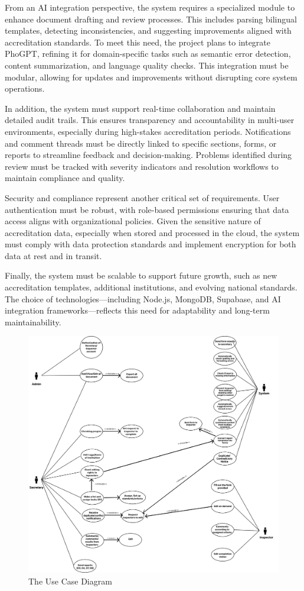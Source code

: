 From an AI integration perspective, the system requires a specialized module to enhance document drafting and review processes. This includes parsing bilingual templates, detecting inconsistencies, and suggesting improvements aligned with accreditation standards. To meet this need, the project plans to integrate PhoGPT, refining it for domain-specific tasks such as semantic error detection, content summarization, and language quality checks. This integration must be modular, allowing for updates and improvements without disrupting core system operations.

In addition, the system must support real-time collaboration and maintain detailed audit trails. This ensures transparency and accountability in multi-user environments, especially during high-stakes accreditation periods. Notifications and comment threads must be directly linked to specific sections, forms, or reports to streamline feedback and decision-making. Problems identified during review must be tracked with severity indicators and resolution workflows to maintain compliance and quality.

Security and compliance represent another critical set of requirements. User authentication must be robust, with role-based permissions ensuring that data access aligns with organizational policies. Given the sensitive nature of accreditation data, especially when stored and processed in the cloud, the system must comply with data protection standards and implement encryption for both data at rest and in transit.

Finally, the system must be scalable to support future growth, such as new accreditation templates, additional institutions, and evolving national standards. The choice of technologies—including Node.js, MongoDB, Supabase, and AI integration frameworks—reflects this need for adaptability and long-term maintainability.

\begin{figure}[h]
    \centering
    \includegraphics[width=1\textwidth]{images/UCD.png}
    \caption{The Use Case Diagram} 
    \label{fig:usecase}
\end{figure}

